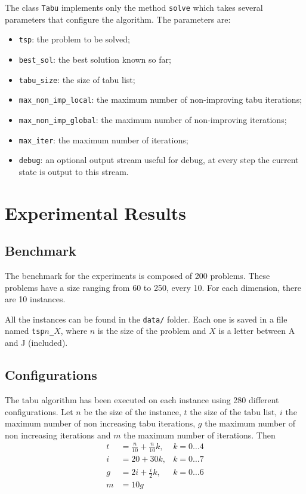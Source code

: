 \documentclass{article}
\begin{document}
The class \texttt{Tabu} implements only the method \texttt{solve} which takes several parameters that configure the algorithm.
The parameters are:
\begin{itemize}
    \item \texttt{tsp}: the problem to be solved;
    \item \texttt{best\_sol}: the best solution known so far;
    \item \texttt{tabu\_size}: the size of tabu list;
    \item \texttt{max\_non\_imp\_local}: the maximum number of non-improving tabu iterations;
    \item \texttt{max\_non\_imp\_global}: the maximum number of non-improving iterations;
    \item \texttt{max\_iter}: the maximum number of iterations;
    \item \texttt{debug}: an optional output stream useful for debug, at every step the current state is output to this stream.
\end{itemize}

\section{Experimental Results}

\subsection{Benchmark}
The benchmark for the experiments is composed of 200 problems.
These problems have a size ranging from 60 to 250, every 10.
For each dimension, there are 10 instances.

All the instances can be found in the \texttt{data/} folder.
Each one is saved in a file named \texttt{tsp$n$\_$X$}, where $n$ is the size of the problem and $X$ is a letter between A and J (included).

\subsection{Configurations}
The tabu algorithm has been executed on each instance using 280 different configurations.
Let $n$ be the size of the instance, $t$ the size of the tabu list, $i$ the maximum number of non increasing tabu iterations, $g$ the maximum number of non increasing iterations and $m$ the maximum number of iterations.
Then
\begin{align*}
    t & = \frac{n}{10} + \frac{n}{10} k, & k = 0 \dots 4 \\
    i & = 20 + 30 k,                     & k = 0 \dots 7 \\
    g & = 2 i + \frac{i}{2} k,           & k = 0 \dots 6 \\
    m & = 10 g
\end{align*}
\end{document}
